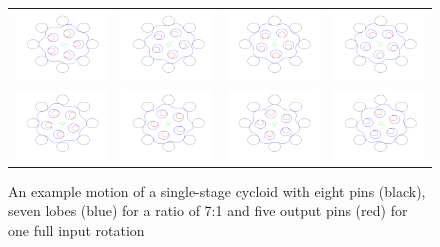 \begin{figure}[h]
   \centering
   \begin{tabular}{cccc}
     \includegraphics[width=0.24\linewidth]{fig/single_0} &
     \includegraphics[width=0.24\linewidth]{fig/single_1} &
     \includegraphics[width=0.24\linewidth]{fig/single_2} &
     \includegraphics[width=0.24\linewidth]{fig/single_3} \\
     \includegraphics[width=0.24\linewidth]{fig/single_4} &
     \includegraphics[width=0.24\linewidth]{fig/single_5} &
     \includegraphics[width=0.24\linewidth]{fig/single_6} &
     \includegraphics[width=0.24\linewidth]{fig/single_7} \\
   \end{tabular}
   \caption{An example motion of a single-stage cycloid with eight pins (black), seven lobes (blue) for a ratio of 7:1 and five output pins (red) for one full input rotation}
   \label{fig:single_motion}
\end{figure}

